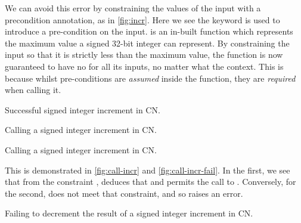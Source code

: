 We can avoid this error by constraining the values of the input with a
precondition annotation, as in \cref{fig:incr}. Here we see the keyword
 is used to introduce a pre-condition on the input.
 is an in-built function which represents the maximum value a
signed 32-bit integer can represent. By constraining the input so that it is
strictly less than the maximum value, the function is now guaranteed to have
no  for all its inputs, no matter what the context. This is because
whilst pre-conditions are \emph{assumed} inside the function, they are
\emph{required} when calling it.

\begin{marginfigure}
    \centering
    \caption{Successful signed integer increment in CN.}\label{fig:incr}
\end{marginfigure}

\begin{marginfigure}
    \ContinuedFloat*
    \centering
    \caption{Calling a signed integer increment in CN.}\label{fig:call-incr}
\end{marginfigure}

\begin{marginfigure}
    \ContinuedFloat{}
    \centering
    \caption{Calling a signed integer increment in CN.}\label{fig:call-incr-fail}
\end{marginfigure}

This is demonstrated in \cref{fig:call-incr} and \cref{fig:call-incr-fail}. In
the first, we see that from the constraint ,  deduces that  and permits the call to .
Conversely, for the second,  does not meet that constraint,
and so  raises an error.

\begin{marginfigure}
    \centering
    \caption{Failing to decrement the result of a signed integer increment in
        CN.}\label{fig:decr-broken}
\end{marginfigure}

